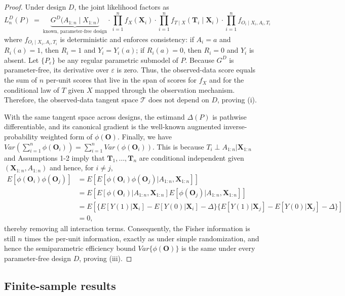 \documentclass[12pt]{article}
\newcommand{\bX}{\boldsymbol{X}}
\newcommand{\bO}{\boldsymbol{O}}
\newcommand{\bT}{\boldsymbol{T}}
\begin{document}
\begin{proof}
Under design $D$, the joint likelihood factors as
\[
L_n^D(P)\ =\
\underbrace{G^D\!\big(A_{1:n}\mid X_{1:n}\big)}_{\text{known, parameter-free design}}
\cdot \prod_{i=1}^n f_X(\bX_i)\cdot
\prod_{i=1}^n f_{T\mid X}(\bT_i\mid \bX_i)
\cdot \prod_{i=1}^n f_{O_i\mid X_i,A_i,T_i}
\]
where $f_{O_i\mid  X_i,A_i,T_i}$ is deterministic and enforces consistency:
if $A_i=a$ and $R_i(a)=1$, then $R_i=1$ and $Y_i=Y_i(a)$; if $R_i(a)=0$, then $R_i=0$ and $Y_i$ is absent.
Let $\{P_\varepsilon\}$ be any regular parametric submodel of $P$.
Because $G^D$ is parameter-free, its derivative over $\varepsilon$ is zero. Thus, the observed-data score equals the sum of $n$ per-unit scores
that live in the span of scores for $f_X$ and for the conditional law of $T$ given $X$ mapped through the observation mechanism.
Therefore, the observed-data tangent space $\mathcal T$ does not depend on $D$, proving (i).

With the same tangent space across designs, the estimand $\Delta(P)$ is pathwise differentiable, and its canonical gradient is the well-known augmented inverse-probability weighted form of $\phi(\bO)$. Finally, we have $Var(\sum_{i=1}^n \phi(\bO_i)) = \sum_{i=1}^n Var(\phi(\bO_i))$. This is because $T_i \perp A_{1:n}|\bX_{1:n}$ and Assumptions 1-2 imply that $\bT_1,\dots, \bT_n$ are conditional independent given $(\bX_{1:n}, A_{1:n})$ and hence, for $i\ne j$,
\begin{align*}
   E[\phi(\bO_i)\phi(\bO_j)] &= E[E[\phi(\bO_i)\phi(\bO_j)|A_{1:n}, 
   \bX_{1:n}]] \\
   &= E[E[\phi(\bO_i)|A_{1:n}, \bX_{1:n}]E[\phi(\bO_j)|A_{1:n}, \bX_{1:n}]] \\
   &= E[\{E[Y(1)|\bX_i]-E[Y(0)|\bX_i]-\Delta\}\{E[Y(1)|\bX_j]-E[Y(0)|\bX_j]-\Delta\}]\\
   &=0,
\end{align*}
thereby removing all interaction terms. Consequently, the Fisher information is still $n$ times the per-unit information, exactly as under simple randomization, and hence the semiparametric efficiency bound $Var\{\phi(\bO)\}$ is the same under every parameter-free design $D$, proving (iii).
\end{proof}


\subsection{Finite-sample results}



{


}
\end{document}

